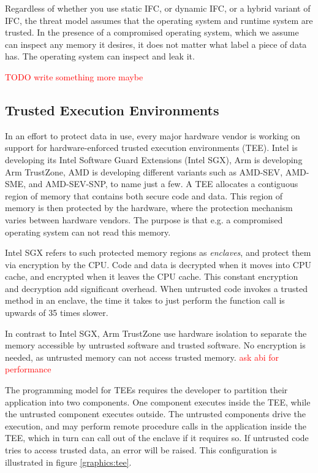 Regardless of whether you use static IFC, or dynamic IFC, or a hybrid variant of IFC, the threat model assumes that the
operating system and runtime system are trusted. In the presence of a compromised operating system, which we assume can
inspect any memory it desires, it does not matter what label a piece of data has. The operating system can inspect and
leak it.

\textcolor{red}{TODO write something more maybe}

\subsection{Trusted Execution Environments}

In an effort to protect data in use, every major hardware vendor is working on support for hardware-enforced trusted
execution environments (TEE). Intel is developing its Intel Software Guard Extensions (Intel SGX)\cite{intelsgx}, Arm is
developing Arm TrustZone\cite{armtz}, AMD is developing different variants such as AMD-SEV\cite{amdsev}, AMD-SME, and
AMD-SEV-SNP, to name just a few. A TEE allocates a contiguous region of memory that contains both secure code and data.
This region of memory is then protected by the hardware, where the protection mechanism varies between hardware vendors.
The purpose is that e.g. a compromised operating system can not read this memory.

Intel SGX refers to such protected memory regions as \textit{enclaves}, and protect them via encryption by the CPU. Code and
data is decrypted when it moves into CPU cache, and encrypted when it leaves the CPU cache. This constant encryption
and decryption add significant overhead. When untrusted code invokes a trusted method in an enclave, the time it takes
to just perform the function call is upwards of 35 times slower.

In contrast to Intel SGX, Arm TrustZone use hardware isolation to separate the memory accessible by untrusted software and
trusted software. No encryption is needed, as untrusted memory can not access trusted memory. \textcolor{red}{ask abi for performance}

The programming model for TEEs requires the developer to partition their application into two components. One component
executes inside the TEE, while the untrusted component executes outside. The untrusted components drive the execution, and may
perform remote procedure calls in the application inside the TEE, which in turn can call out of the enclave if it requires so.
If untrusted code tries to access trusted data, an error will be raised. This configuration is illustrated in
figure \ref{graphics:tee}.

